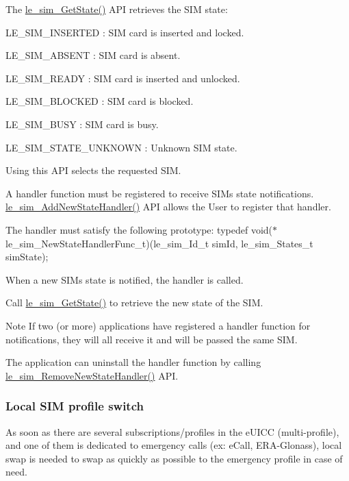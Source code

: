 The \hyperlink{le__sim__interface_8h_a16b06f266471d81f772e5439ec570144}{le\+\_\+sim\+\_\+\+Get\+State()} A\+P\+I retrieves the S\+I\+M state\+:
\begin{DoxyItemize}
\item L\+E\+\_\+\+S\+I\+M\+\_\+\+I\+N\+S\+E\+R\+T\+E\+D \+: S\+I\+M card is inserted and locked.
\item L\+E\+\_\+\+S\+I\+M\+\_\+\+A\+B\+S\+E\+N\+T \+: S\+I\+M card is absent.
\item L\+E\+\_\+\+S\+I\+M\+\_\+\+R\+E\+A\+D\+Y \+: S\+I\+M card is inserted and unlocked.
\item L\+E\+\_\+\+S\+I\+M\+\_\+\+B\+L\+O\+C\+K\+E\+D \+: S\+I\+M card is blocked.
\item L\+E\+\_\+\+S\+I\+M\+\_\+\+B\+U\+S\+Y \+: S\+I\+M card is busy.
\item L\+E\+\_\+\+S\+I\+M\+\_\+\+S\+T\+A\+T\+E\+\_\+\+U\+N\+K\+N\+O\+W\+N \+: Unknown S\+I\+M state.
\end{DoxyItemize}

Using this A\+P\+I selects the requested S\+I\+M.

A handler function must be registered to receive S\+I\+M\textquotesingle{}s state notifications. \hyperlink{le__sim__interface_8h_a8e296a7cd35edd99cb1dc21232e280dd}{le\+\_\+sim\+\_\+\+Add\+New\+State\+Handler()} A\+P\+I allows the User to register that handler.

The handler must satisfy the following prototype\+: typedef void($\ast$le\+\_\+sim\+\_\+\+New\+State\+Handler\+Func\+\_\+t)(le\+\_\+sim\+\_\+\+Id\+\_\+t sim\+Id, le\+\_\+sim\+\_\+\+States\+\_\+t sim\+State);

When a new S\+I\+M\textquotesingle{}s state is notified, the handler is called.

Call \hyperlink{le__sim__interface_8h_a16b06f266471d81f772e5439ec570144}{le\+\_\+sim\+\_\+\+Get\+State()} to retrieve the new state of the S\+I\+M.

\begin{DoxyNote}{Note}
If two (or more) applications have registered a handler function for notifications, they will all receive it and will be passed the same S\+I\+M.
\end{DoxyNote}
The application can uninstall the handler function by calling \hyperlink{le__sim__interface_8h_a8e3a4e2e978cf4931a39317ee5e9f762}{le\+\_\+sim\+\_\+\+Remove\+New\+State\+Handler()} A\+P\+I.\hypertarget{c_sim_le_sim_profile_switch}{}\subsubsection{Local S\+I\+M profile switch}\label{c_sim_le_sim_profile_switch}
As soon as there are several subscriptions/profiles in the e\+U\+I\+C\+C (multi-\/profile), and one of them is dedicated to emergency calls (ex\+: e\+Call, E\+R\+A-\/\+Glonass), local swap is needed to swap as quickly as possible to the emergency profile in case of need.

